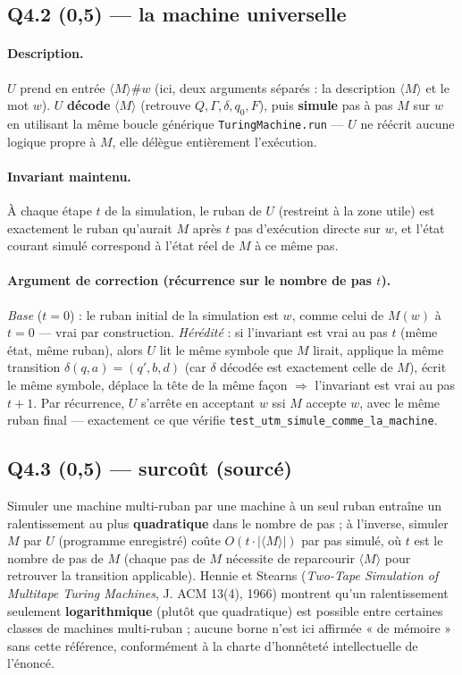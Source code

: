 \documentclass[11pt,a4paper]{scrartcl}
\begin{document}
\subsection*{Q4.2 (0,5) — la machine universelle}

\paragraph{Description.} $U$ prend en entrée $\langle M\rangle \# w$ (ici, deux
arguments séparés : la description $\langle M\rangle$ et le mot $w$). $U$
\textbf{décode} $\langle M\rangle$ (retrouve $Q,\Gamma,\delta,q_0,F$), puis
\textbf{simule} pas à pas $M$ sur $w$ en utilisant la même boucle générique
\texttt{TuringMachine.run} — $U$ ne réécrit aucune logique propre à $M$, elle
délègue entièrement l'exécution.

\paragraph{Invariant maintenu.} À chaque étape $t$ de la simulation, le ruban de
$U$ (restreint à la zone utile) est exactement le ruban qu'aurait $M$ après $t$
pas d'exécution directe sur $w$, et l'état courant simulé correspond à l'état
réel de $M$ à ce même pas.

\paragraph{Argument de correction (récurrence sur le nombre de pas $t$).}
\emph{Base} ($t=0$) : le ruban initial de la simulation est $w$, comme celui de
$M(w)$ à $t=0$ — vrai par construction. \emph{Hérédité} : si l'invariant est vrai
au pas $t$ (même état, même ruban), alors $U$ lit le même symbole que $M$
lirait, applique la même transition $\delta(q,a)=(q',b,d)$ (car $\delta$ décodée
est exactement celle de $M$), écrit le même symbole, déplace la tête de la même
façon $\Rightarrow$ l'invariant est vrai au pas $t+1$. Par récurrence, $U$
s'arrête en acceptant $w$ ssi $M$ accepte $w$, avec le même ruban final —
exactement ce que vérifie \texttt{test\_utm\_simule\_comme\_la\_machine}.

\subsection*{Q4.3 (0,5) — surcoût (sourcé)}

Simuler une machine multi-ruban par une machine à un seul ruban entraîne un
ralentissement au plus \textbf{quadratique} dans le nombre de pas ; à l'inverse,
simuler $M$ par $U$ (programme enregistré) coûte $O(t\cdot|\langle M\rangle|)$ par
pas simulé, où $t$ est le nombre de pas de $M$ (chaque pas de $M$ nécessite de
reparcourir $\langle M\rangle$ pour retrouver la transition applicable). Hennie
et Stearns (\emph{Two-Tape Simulation of Multitape Turing Machines}, J. ACM
13(4), 1966) montrent qu'un ralentissement seulement \textbf{logarithmique}
(plutôt que quadratique) est possible entre certaines classes de machines
multi-ruban ; aucune borne n'est ici affirmée « de mémoire » sans cette
référence, conformément à la charte d'honnêteté intellectuelle de l'énoncé.
\end{document}
